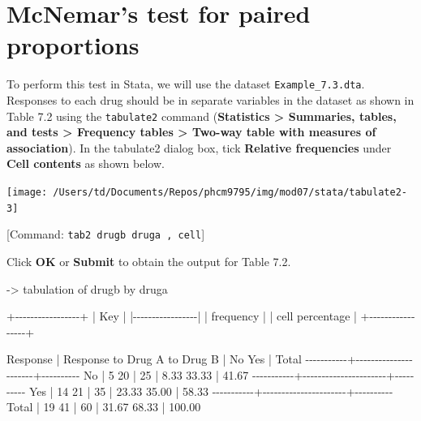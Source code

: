 \documentclass[
]{memoir}
\newenvironment{Shaded}{\begin{snugshade}}{\end{snugshade}}
\newcommand{\NormalTok}[1]{#1}
\begin{document}
\hypertarget{mcnemars-test-for-paired-proportions}{%
\section{McNemar's test for paired proportions}\label{mcnemars-test-for-paired-proportions}}

To perform this test in Stata, we will use the dataset \texttt{Example\_7.3.dta}. Responses to each drug should be in separate variables in the dataset as shown in Table 7.2 using the \texttt{tabulate2} command (\textbf{Statistics \textgreater{} Summaries, tables, and tests \textgreater{} Frequency tables \textgreater{} Two-way table with measures of association}). In the tabulate2 dialog box, tick \textbf{Relative frequencies} under \textbf{Cell contents} as shown below.

\texttt{[image: /Users/td/Documents/Repos/phcm9795/img/mod07/stata/tabulate2-3]}

{[}Command: \texttt{tab2\ drugb\ druga\ ,\ cell}{]}

Click \textbf{OK} or \textbf{Submit} to obtain the output for Table 7.2.

\begin{Shaded}
\begin{Highlighting}[]
\NormalTok{{-}\textgreater{} tabulation of drugb by druga  }

\NormalTok{+{-}{-}{-}{-}{-}{-}{-}{-}{-}{-}{-}{-}{-}{-}{-}{-}{-}+}
\NormalTok{| Key             |}
\NormalTok{|{-}{-}{-}{-}{-}{-}{-}{-}{-}{-}{-}{-}{-}{-}{-}{-}{-}|}
\NormalTok{|    frequency    |}
\NormalTok{| cell percentage |}
\NormalTok{+{-}{-}{-}{-}{-}{-}{-}{-}{-}{-}{-}{-}{-}{-}{-}{-}{-}+}

\NormalTok{  Response |  Response to Drug A}
\NormalTok{ to Drug B |        No        Yes |     Total}
\NormalTok{{-}{-}{-}{-}{-}{-}{-}{-}{-}{-}{-}+{-}{-}{-}{-}{-}{-}{-}{-}{-}{-}{-}{-}{-}{-}{-}{-}{-}{-}{-}{-}{-}{-}+{-}{-}{-}{-}{-}{-}{-}{-}{-}{-}}
\NormalTok{        No |         5         20 |        25 }
\NormalTok{           |      8.33      33.33 |     41.67 }
\NormalTok{{-}{-}{-}{-}{-}{-}{-}{-}{-}{-}{-}+{-}{-}{-}{-}{-}{-}{-}{-}{-}{-}{-}{-}{-}{-}{-}{-}{-}{-}{-}{-}{-}{-}+{-}{-}{-}{-}{-}{-}{-}{-}{-}{-}}
\NormalTok{       Yes |        14         21 |        35 }
\NormalTok{           |     23.33      35.00 |     58.33 }
\NormalTok{{-}{-}{-}{-}{-}{-}{-}{-}{-}{-}{-}+{-}{-}{-}{-}{-}{-}{-}{-}{-}{-}{-}{-}{-}{-}{-}{-}{-}{-}{-}{-}{-}{-}+{-}{-}{-}{-}{-}{-}{-}{-}{-}{-}}
\NormalTok{     Total |        19         41 |        60 }
\NormalTok{           |     31.67      68.33 |    100.00 }
\end{Highlighting}
\end{Shaded}
\end{document}

